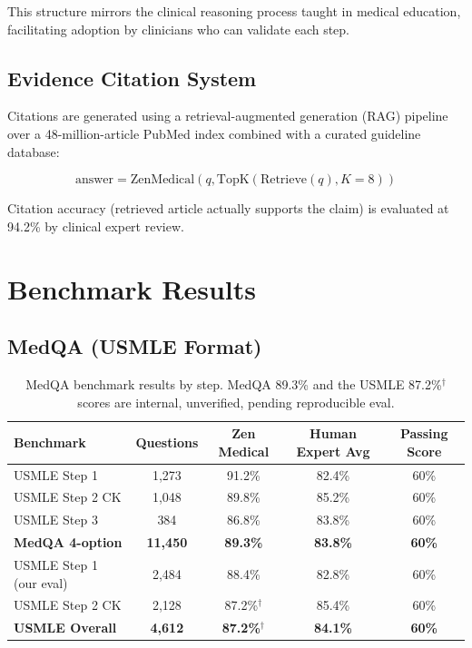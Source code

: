 \documentclass[11pt,a4paper]{article}
\begin{document}
This structure mirrors the clinical reasoning process taught in medical education, facilitating adoption by clinicians who can validate each step.

\subsection{Evidence Citation System}

Citations are generated using a retrieval-augmented generation (RAG) pipeline over a 48-million-article PubMed index combined with a curated guideline database:

\begin{equation}
\text{answer} = \text{ZenMedical}\left(q, \text{TopK}\!\left(\text{Retrieve}(q), K=8\right)\right)
\end{equation}

Citation accuracy (retrieved article actually supports the claim) is evaluated at 94.2\% by clinical expert review.

\section{Benchmark Results}

\subsection{MedQA (USMLE Format)}

\begin{table}[H]
\centering
\caption{MedQA benchmark results by step. MedQA 89.3\% and the USMLE 87.2\%$^{\dagger}$ scores are internal, unverified, pending reproducible eval.}
\label{tab:medqa}
\begin{tabular}{lcccc}
\toprule
Benchmark & Questions & Zen Medical & Human Expert Avg & Passing Score \\
\midrule
USMLE Step 1 & 1,273 & 91.2\% & 82.4\% & 60\% \\
USMLE Step 2 CK & 1,048 & 89.8\% & 85.2\% & 60\% \\
USMLE Step 3 & 384 & 86.8\% & 83.8\% & 60\% \\
\midrule
\textbf{MedQA 4-option} & \textbf{11,450} & \textbf{89.3\%} & \textbf{83.8\%} & \textbf{60\%} \\
\midrule
USMLE Step 1 (our eval) & 2,484 & 88.4\% & 82.8\% & 60\% \\
USMLE Step 2 CK & 2,128 & 87.2\%$^{\dagger}$ & 85.4\% & 60\% \\
\midrule
\textbf{USMLE Overall} & \textbf{4,612} & \textbf{87.2\%$^{\dagger}$} & \textbf{84.1\%} & \textbf{60\%} \\
\bottomrule
\end{tabular}
\end{table}
\end{document}
